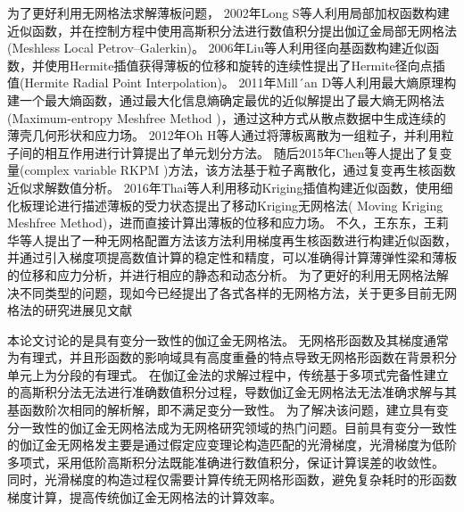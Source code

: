为了更好利用无网格法求解薄板问题，
2002年Long S等人\textsuperscript{\cite{long2002}}利用局部加权函数构建近似函数，并在控制方程中使用高斯积分法进行数值积分提出伽辽金局部无网格法(Meshless Local Petrov–Galerkin)。
2006年Liu等人\textsuperscript{\cite{liu2006}}利用径向基函数构建近似函数，并使用Hermite插值获得薄板的位移和旋转的连续性提出了Hermite径向点插值(Hermite Radial Point Interpolation)。
2011年Mill´an D等人\textsuperscript{\cite{millan2011}}利用最大熵原理构建一个最大熵函数，通过最大化信息熵确定最优的近似解提出了最大熵无网格法(Maximum-entropy Meshfree  Method )，通过这种方式从散点数据中生成连续的薄壳几何形状和应力场。
2012年Oh H等人\textsuperscript{\cite{oh2012}}通过将薄板离散为一组粒子，并利用粒子间的相互作用进行计算提出了单元划分方法。
随后2015年Chen等人\textsuperscript{\cite{chen2015}}提出了复变量(complex variable RKPM )方法，该方法基于粒子离散化，通过复变再生核函数近似求解数值分析。
2016年Thai等人\textsuperscript{\cite{thai2016}}利用移动Kriging插值构建近似函数，使用细化板理论进行描述薄板的受力状态提出了移动Kriging无网格法( Moving Kriging Meshfree Method)，进而直接计算出薄板的位移和应力场。
不久，王东东，王莉华等人\textsuperscript{\cite{wang2020,wang2021}}提出了一种无网格配置方法该方法利用梯度再生核函数进行构建近似函数，并通过引入梯度项提高数值计算的稳定性和精度，可以准确得计算薄弹性梁和薄板的位移和应力分析，并进行相应的静态和动态分析。
为了更好的利用无网格法解决不同类型的问题，现如今已经提出了各式各样的无网格方法\textsuperscript{\cite{ChengYuMin2005,TanXianYun2011,LianYanPing2013,ZhangXiong2017,GaoXiaoWei2019}}，关于更多目前无网格法的研究进展见文献\textsuperscript{\cite{nguyen2008,liu2009,张雄2009无网格法的理论及应用,wang2014,yreux2017,koester2019,rohit2018,王莉华2021配点型无网格法理论和研究进展,LiuYuXiang2021,朱志辉2021基于,sriram2021,ChenJian2022,LiYuDong2022}}
\par
本论文讨论的是具有变分一致性的伽辽金无网格法\textsuperscript{\cite{babuska2008,wu2021}}。
无网格形函数及其梯度通常为有理式，并且形函数的影响域具有高度重叠的特点导致无网格形函数在背景积分单元上为分段的有理式。
在伽辽金法的求解过程中，传统基于多项式完备性建立的高斯积分法无法进行准确数值积分过程，导数伽辽金无网格法无法准确求解与其基函数阶次相同的解析解，即不满足变分一致性\textsuperscript{\cite{1999Numerical}}。
为了解决该问题，建立具有变分一致性的伽辽金无网格法成为无网格研究领域的热门问题。目前具有变分一致性的伽辽金无网格发主要是通过假定应变理论构造匹配的光滑梯度，光滑梯度为低阶多项式，采用低阶高斯积分法既能准确进行数值积分，保证计算误差的收敛性。
同时，光滑梯度的构造过程仅需要计算传统无网格形函数，避免复杂耗时的形函数梯度计算，提高传统伽辽金无网格法的计算效率。
